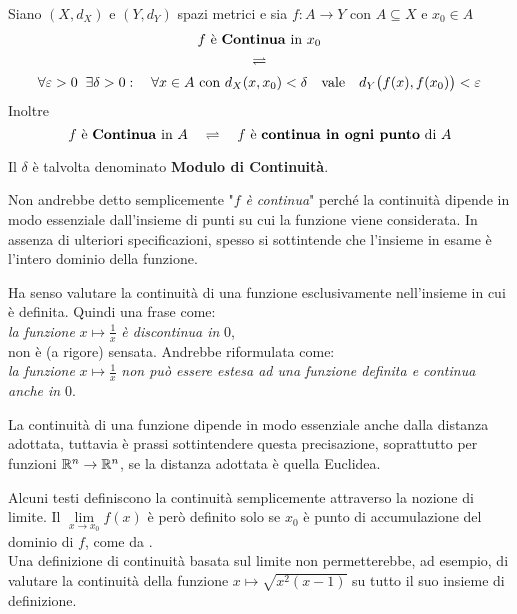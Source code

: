 \begin{definition}
	\label{def:funz_cont}
	Siano $(X,d_X)$ e $(Y,d_Y)$ spazi metrici e sia $f: A \to Y$ con $A \subseteq X$ e $x_0 \in A$
	\begin{equation*}
		\begin{gathered}
			f \text{ è \textbf{Continua} in } x_0\\
			\rightleftharpoons\\
			\forall \varepsilon > 0\;\;\exists \delta > 0:\quad \forall x \in A \text{ con } d_X(x,x_0)<\delta \quad \text{vale} \quad d_Y \bigl(f(x),f(x_0)\bigr) < \varepsilon
		\end{gathered}
	\end{equation*}
	Inoltre
	\[f \text{ è \textbf{Continua} in } A \quad \rightleftharpoons \quad f \text{ è \textbf{continua in ogni punto} di } A\]
	\vspace*{-\baselineskip}
	\begin{note}
		Il $\delta$ è talvolta denominato \textbf{Modulo di Continuità}.
	\end{note}
	\begin{note}
		Non andrebbe detto semplicemente "$f$ \textit{è continua}" perché la continuità dipende in modo essenziale dall'insieme di punti su cui la funzione viene considerata. In assenza di ulteriori specificazioni, spesso si sottintende che l'insieme in esame è l'intero dominio della funzione.
	\end{note}
	\begin{note}
		Ha senso valutare la continuità di una funzione esclusivamente nell'insieme in cui è definita. Quindi una frase come:\\
		\textit{la funzione} $x \mapsto \frac{1}{x}$ \textit{è discontinua in} $0$,\\
		non è (a rigore) sensata. Andrebbe riformulata come:\\
		\textit{la funzione} $x \mapsto \frac{1}{x}$ \textit{non può essere estesa ad una funzione definita e continua anche in} $0$.
	\end{note}
	\begin{note}
		La continuità di una funzione dipende in modo essenziale anche dalla distanza adottata, tuttavia è prassi sottintendere questa precisazione, soprattutto per funzioni $\mathbb{R}^n \to \mathbb{R}^n$, se la distanza adottata è quella Euclidea.
	\end{note}
\end{definition}
\begin{observation}
	Alcuni testi definiscono la continuità semplicemente attraverso la nozione di limite. Il $\lim\limits_{x \to x_0} f(x)$ è però definito solo se $x_0$ è punto di accumulazione del dominio di $f$, come da .\\
	Una definizione di continuità basata sul limite non permetterebbe, ad esempio, di valutare la continuità della funzione $x \mapsto \sqrt{x^2(x-1)}$ su tutto il suo insieme di definizione.
\end{observation}
